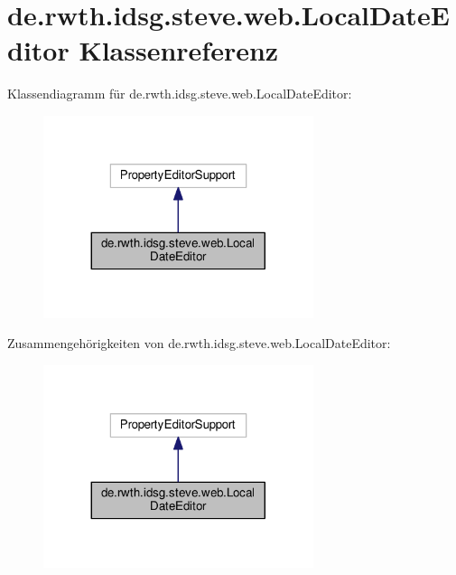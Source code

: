 \hypertarget{classde_1_1rwth_1_1idsg_1_1steve_1_1web_1_1_local_date_editor}{\section{de.\-rwth.\-idsg.\-steve.\-web.\-Local\-Date\-Editor Klassenreferenz}
\label{classde_1_1rwth_1_1idsg_1_1steve_1_1web_1_1_local_date_editor}
}


Klassendiagramm für de.\-rwth.\-idsg.\-steve.\-web.\-Local\-Date\-Editor\-:\nopagebreak
\begin{figure}[H]
\begin{center}
\leavevmode
\includegraphics[width=224pt]{classde_1_1rwth_1_1idsg_1_1steve_1_1web_1_1_local_date_editor__inherit__graph}
\end{center}
\end{figure}


Zusammengehörigkeiten von de.\-rwth.\-idsg.\-steve.\-web.\-Local\-Date\-Editor\-:\nopagebreak
\begin{figure}[H]
\begin{center}
\leavevmode
\includegraphics[width=224pt]{classde_1_1rwth_1_1idsg_1_1steve_1_1web_1_1_local_date_editor__coll__graph}
\end{center}
\end{figure}
